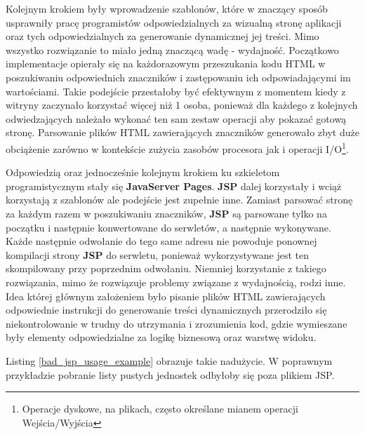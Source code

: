 		Kolejnym krokiem były wprowadzenie szablonów, które w znaczący sposób usprawniły pracę programistów odpowiedzialnych za wizualną stronę
		aplikacji oraz tych odpowiedzialnych za generowanie dynamicznej jej treści. Mimo wszystko rozwiązanie to miało jedną znaczącą wadę - wydajność. 
		Początkowo implementacje opierały się na każdorazowym przeszukania kodu HTML w poszukiwaniu odpowiednich znaczników i zastępowaniu ich odpowiadającymi
		im wartościami. Takie podejście przestałoby być efektywnym z momentem kiedy z witryny zaczynało korzystać więcej niż 1 osoba, ponieważ dla każdego
		z kolejnych odwiedzających należało wykonać ten sam zestaw operacji aby pokazać gotową stronę. Parsowanie plików HTML zawierających znaczników
		generowało zbyt duże obciążenie zarówno w kontekście zużycia zasobów procesora jak i operacji I/O\footnote{Operacje dyskowe, na plikach, 
		często określane mianem operacji Wejścia/Wyjścia}\cite{art_of_java_web_dev}. 
		
	 	Odpowiedzią oraz jednocześnie kolejnym krokiem ku szkieletom programistycznym stały się \textbf{JavaServer Pages}\cite{jsp_spec}. 
		\textbf{JSP} dalej korzystały i wciąż korzystają z szablonów ale podejście jest zupełnie inne. 
		Zamiast parsować stronę za każdym razem w poszukiwaniu znaczników, \textbf{JSP} są parsowane tylko na początku i następnie konwertowane
		do serwletów, a następnie wykonywane. Każde następnie odwołanie do tego same adresu nie powoduje ponownej kompilacji strony \textbf{JSP} do serwletu,
		ponieważ wykorzystywane jest ten skompilowany przy poprzednim odwołaniu. Niemniej korzystanie z takiego rozwiązania, mimo że rozwiązuje problemy
		związane z wydajnością, rodzi inne. Idea której głównym założeniem było pisanie plików HTML zawierających odpowiednie instrukcji do generowanie 
		treści dynamicznych przerodziło się niekontrolowanie w trudny do utrzymania i zrozumienia kod, gdzie wymieszane były elementy odpowiedzialne 
		za logikę biznesową oraz warstwę widoku\cite{art_of_java_web_dev}.
		Listing \ref{bad_jsp_usage_example} obrazuje takie nadużycie. W poprawnym przykładzie pobranie listy pustych jednostek odbyłoby się poza plikiem JSP. 
		
